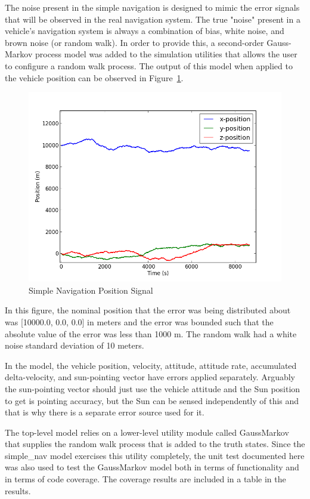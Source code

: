 \documentclass[]{LASPreport}
\begin{document}
The noise present in the simple navigation is designed to mimic the error signals 
that will be observed in the real navigation system.  The true "noise" present 
in a vehicle's navigation system is always a combination of bias, white noise, 
and brown noise (or random walk).  In order to provide this, a second-order 
Gauss-Markov process model was added to the simulation utilities that allows 
the user to configure a random walk process.  The output of this model when 
applied to the vehicle position can be observed in Figure~\ref{fig:pos_fig}.
\begin{figure}[htb]
        \centerline{
        \includegraphics[scale=0.5]{Figures/SimpleNavPosition}
        }
        \caption{Simple Navigation Position Signal}
        \label{fig:pos_fig}
\end{figure} 

In this figure, the nominal position that the error was being distributed about
 was [10000.0, 0.0, 0.0] in meters and the error was bounded such that the 
absolute value of the error was less than 1000 m.  The random walk had a white 
noise standard deviation of 10 meters.

In the model, the vehicle position, velocity, attitude, attitude rate, 
accumulated delta-velocity, and sun-pointing vector have errors applied 
separately.  Arguably the sun-pointing vector should just use the vehicle 
attitude and the Sun position to get is pointing accuracy, but the Sun can be 
sensed independently of this and that is why there is a separate error source
used for it.

The top-level model relies on a lower-level utility module called GaussMarkov 
that supplies the random walk process that is added to the truth states.  
Since the simple\_nav model exercises this utility completely, the unit test 
documented here was also used to test the GaussMarkov model both in terms of 
functionality and in terms of code coverage.  The coverage results are included 
in a table in the results.
\end{document}
